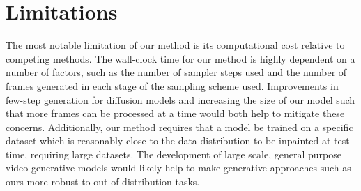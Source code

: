 \chapter{Limitations}
The most notable limitation of our method is its computational cost relative to competing methods. The wall-clock time for our method is highly dependent on a number of factors, such as the number of sampler steps used and the number of frames generated in each stage of the sampling scheme used. Improvements in few-step generation for diffusion models and increasing the size of our model such that more frames can be processed at a time would both help to mitigate these concerns. Additionally, our method requires that a model be trained on a specific dataset which is reasonably close to the data distribution to be inpainted at test time, requiring large datasets. The development of large scale, general purpose video generative models would likely help to make generative approaches such as ours more robust to out-of-distribution tasks.  
